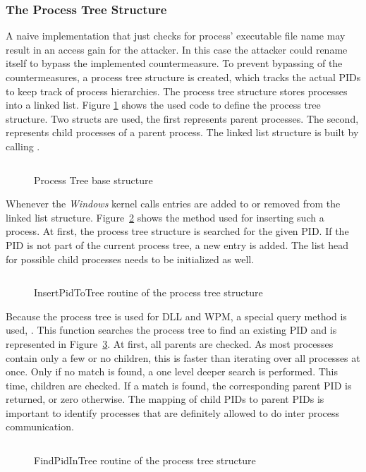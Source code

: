 \subsubsection{The Process Tree Structure}
A naive implementation that just checks for process' executable file name may result in an access gain for the attacker. In this case the attacker could rename itself to bypass the implemented countermeasure. To prevent bypassing of the countermeasures, a process tree structure is created, which tracks the actual \glspl{PID} to keep track of process hierarchies. The process tree structure stores processes into a linked list. Figure \ref{code:code1} shows the used code to define the process tree structure. Two structs are used, the first  represents parent processes. The second,  represents child processes of a parent process. The linked list structure is built by calling  \cite{msdn_initlisthead}.
\begin{figure}[h]
\inputminted[breakanywhere, breaklines,fontsize=\scriptsize, frame=single, mathescape, linenos, numbersep=5pt, numbersep=5pt, xleftmargin=0pt]{c}{sections/implementation/code1.c}
\caption{Process Tree base structure}
\label{code:code1}
\end{figure}
Whenever the \emph{Windows} kernel calls  entries are added to or removed from the linked list structure. Figure~\ref{code:code2} shows the method used for inserting such a process. At first, the process tree structure is searched for the given \gls{PID}. If the \gls{PID} is not part of the current process tree, a new entry is added. The list head for possible child processes needs to be initialized as well.
\begin{figure}[h]
\inputminted[breakanywhere, breaklines,fontsize=\scriptsize, frame=single, mathescape, linenos, numbersep=5pt, numbersep=5pt, xleftmargin=0pt]{c}{sections/implementation/code2.c}
\caption{InsertPidToTree routine of the process tree structure}
\label{code:code2}
\end{figure}
Because the process tree is used for \gls{DLL} and \gls{WPM}, a special query method is used, . This function searches the process tree to find an existing \gls{PID} and is represented in Figure~\ref{code:code3}. At first, all parents are checked. As most processes contain only a few or no children, this is faster than iterating over all processes at once. Only if no match is found, a one level deeper search is performed. This time, children are checked. If a match is found, the corresponding parent \gls{PID} is returned, or zero otherwise. The mapping of child \glspl{PID} to parent \glspl{PID} is important to identify processes that are definitely allowed to do inter process communication.
\begin{figure}[h]
\inputminted[breakanywhere, breaklines,fontsize=\scriptsize, frame=single, mathescape, linenos, numbersep=5pt, numbersep=5pt, xleftmargin=0pt]{c}{sections/implementation/code3.c}
\caption{FindPidInTree routine of the process tree structure}
\label{code:code3}
\end{figure}

